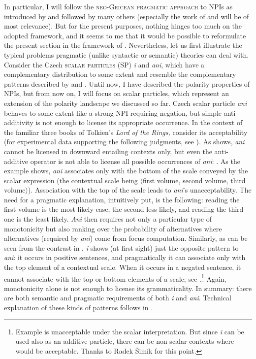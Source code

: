 \documentclass[output=paper,colorlinks,citecolor=brown]{langscibook}
\begin{document}
In particular, I will follow the \textsc{neo-Gricean pragmatic approach} to NPIs as introduced by \citet{krifka1995semantics} and followed by many others (especially the work of \citealt{Crnic2011} and \citealt{alonso2016all} will be of most relevance). But for the present purposes, nothing hinges too much on the adopted framework, and it seems to me that it would be possible to reformulate the present section in the framework of \citet{Chierchia2013}. Nevertheless, let us first illustrate the typical problems pragmatic (unlike syntactic or semantic) theories can deal with. Consider the Czech \textsc{scalar particles} (SP) \emph{i} and \emph{ani}, which have a complementary distribution to some extent and resemble the complementary patterns described by \citet{Progovac1993a} and \citet{Blaszczak2001}. Until now, I have described the polarity properties of NPIs, but from now on, I will focus on scalar particles, which represent an extension of the polarity landscape we discussed so far. Czech scalar particle \emph{ani} behaves to some extent like a strong NPI requiring negation, but simple anti-additivity is not enough to license its appropriate occurrence. In the context of the familiar three books of Tolkien's \textit{Lord of the Rings,} consider its acceptability (for experimental data supporting the following judgments, see \citealt{DocekalSafratova2019}). As  shows, \emph{ani} cannot be licensed in downward entailing contexts only, but even the anti-additive operator is not able to license all possible occurrences of \emph{ani}: . As the example shows, \emph{ani} associates only with the bottom of the scale conveyed by the scalar expression (the contextual scale being $\langle$first volume, second volume, third volume$\rangle$). Association with the top of the scale leads to \emph{ani}'s unacceptability. The need for a pragmatic explanation, intuitively put, is the following: reading the first volume is the most likely case, the second less likely, and reading the third one is the least likely.
\emph{Ani} then requires not only a particular type of monotonicity but also ranking over the probability of alternatives where alternatives (required by \textit{ani}) come from focus computation. Similarly, as can be seen from the contrast in , \emph{i} shows (at first sight) just the opposite pattern to \emph{ani}: it occurs in positive sentences, and pragmatically it can associate only with the top element of a contextual scale. When it occurs in a negated sentence, it cannot associate with the top or bottom elements of a scale; see .\footnote{Example  is unacceptable under the scalar interpretation. But since \textit{i} can be used also as an additive particle, there can be non-scalar contexts where  would be acceptable. Thanks to Radek Šimík for this point.}
Again, monotonicity alone is not enough to license its grammaticality. In summary: there are both semantic and pragmatic requirements of both \emph{i} and \emph{ani}. Technical explanation of these kinds of patterns follows in .
\end{document}
